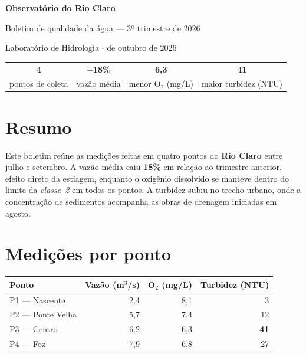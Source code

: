 \documentclass[11pt]{article}
\begin{document}
\begin{tcolorbox}[colback=pena, colframe=pena, sharp corners]
  \color{white}
  {\LARGE\bfseries Observatório do Rio Claro}

  {\large Boletim de qualidade da água --- 3º trimestre de 2026}

  {\small Laboratório de Hidrologia \quad$\cdot$ de outubro de 2026}
\end{tcolorbox}
\medskip

\begin{center}
\begin{tabular}{cccc}
  {\Huge\bfseries\color{pena} 4} & {\Huge\bfseries\color{brasa} $-$18\%} & {\Huge\bfseries\color{folha} 6,3} & {\Huge\bfseries\color{tinta} 41} \\
  {\small\color{nevoa} pontos de coleta} & {\small\color{nevoa} vazão média} & {\small\color{nevoa} menor O$_2$ (mg/L)} & {\small\color{nevoa} maior turbidez (NTU)} \\
\end{tabular}
\end{center}

\section{Resumo}

Este boletim reúne as medições feitas em quatro pontos do \textbf{Rio Claro} entre julho e setembro.
A vazão média caiu \textcolor{brasa}{\textbf{18\%}} em relação ao trimestre anterior, efeito direto
da estiagem, enquanto o oxigênio dissolvido se manteve dentro do limite da \emph{classe~2} em todos
os pontos. A turbidez subiu no trecho urbano, onde a concentração de sedimentos acompanha as obras
de drenagem iniciadas em agosto.

\section{Medições por ponto}

\begin{center}
\begin{tabular}{lrrr}
  \toprule
  \textbf{Ponto} & \textbf{Vazão (m$^3$/s)} & \textbf{O$_2$ (mg/L)} & \textbf{Turbidez (NTU)} \\
  \midrule
  P1 --- Nascente    & 2,4 & 8,1 & 3  \\
  P2 --- Ponte Velha & 5,7 & 7,4 & 12 \\
  P3 --- Centro      & 6,2 & 6,3 & \textcolor{brasa}{\textbf{41}} \\
  P4 --- Foz         & 7,9 & 6,8 & 27 \\
  \bottomrule
\end{tabular}
\end{center}
\end{document}
